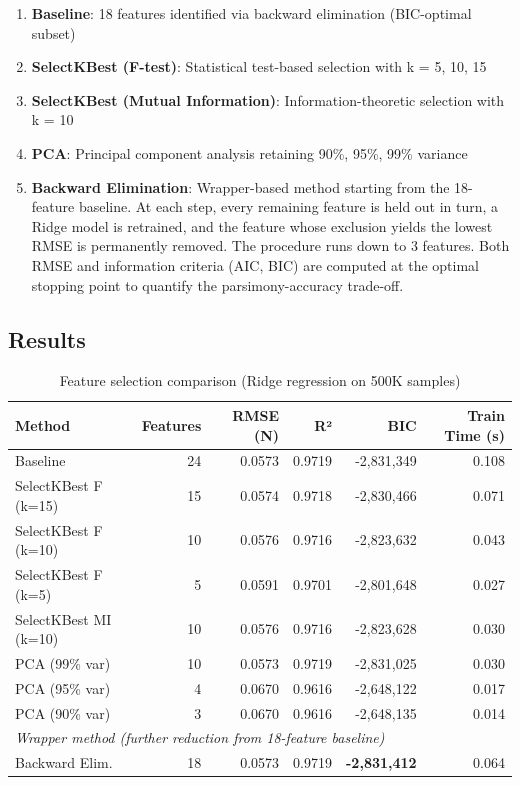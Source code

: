 \documentclass[12pt,a4paper]{article}
\begin{document}
\begin{enumerate}
    \item \textbf{Baseline}: 18 features identified via backward elimination (BIC-optimal subset)
    \item \textbf{SelectKBest (F-test)}: Statistical test-based selection with k = 5, 10, 15
    \item \textbf{SelectKBest (Mutual Information)}: Information-theoretic selection with k = 10
    \item \textbf{PCA}: Principal component analysis retaining 90\%, 95\%, 99\% variance
    \item \textbf{Backward Elimination}: Wrapper-based method starting from the 18-feature baseline. At each step, every remaining feature is held out in turn, a Ridge model is retrained, and the feature whose exclusion yields the lowest RMSE is permanently removed. The procedure runs down to 3 features. Both RMSE and information criteria (AIC, BIC) are computed at the optimal stopping point to quantify the parsimony-accuracy trade-off.
\end{enumerate}

\subsection{Results}

\begin{table}[H]
\centering
\caption{Feature selection comparison (Ridge regression on 500K samples)}
\label{tab:feature_selection}
\small
\begin{tabular}{lrrrrr}
\toprule
\textbf{Method} & \textbf{Features} & \textbf{RMSE (N)} & \textbf{R²} & \textbf{BIC} & \textbf{Train Time (s)} \\
\midrule
Baseline & 24 & 0.0573 & 0.9719 & -2,831,349 & 0.108 \\
SelectKBest F (k=15) & 15 & 0.0574 & 0.9718 & -2,830,466 & 0.071 \\
SelectKBest F (k=10) & 10 & 0.0576 & 0.9716 & -2,823,632 & 0.043 \\
SelectKBest F (k=5) & 5 & 0.0591 & 0.9701 & -2,801,648 & 0.027 \\
SelectKBest MI (k=10) & 10 & 0.0576 & 0.9716 & -2,823,628 & 0.030 \\
PCA (99\% var) & 10 & 0.0573 & 0.9719 & -2,831,025 & 0.030 \\
PCA (95\% var) & 4 & 0.0670 & 0.9616 & -2,648,122 & 0.017 \\
PCA (90\% var) & 3 & 0.0670 & 0.9616 & -2,648,135 & 0.014 \\
\midrule
\multicolumn{6}{l}{\textit{Wrapper method (further reduction from 18-feature baseline)}} \\
Backward Elim. & 18 & 0.0573 & 0.9719 & \textbf{-2,831,412} & 0.064 \\
\bottomrule
\end{tabular}
\end{table}
\end{document}
